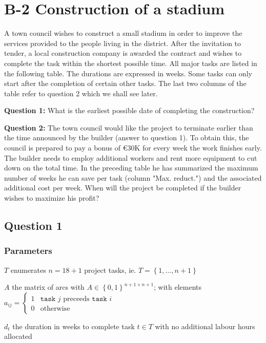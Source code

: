\chapter{B-2 Construction of a stadium}

A town council wishes to construct a small stadium in order to improve the
services provided to the people living in the district. After the invitation to
tender, a local construction company is awarded the contract and wishes
to complete the task within the shortest possible time. All major tasks are
listed in the following table. The durations are expressed in weeks. Some tasks
can only start after the completion of certain other tasks. The last two
columns of the table refer to question 2 which we shall see later.

\textbf{Question 1:} What is the earliest possible date of completing the
construction?

\textbf{Question 2:} The town council would like the project to terminate earlier
than the time announced by the builder (answer to question 1). To obtain this,
the council is prepared to pay a bonus of $\euro{}30\mathrm{K}$ for every week the work
finishes early. The builder needs to employ additional workers and rent more
equipment to cut down on the total time. In the preceding table he has 
summarized the maximum number of weeks he can save per task (column "Max. reduct.")
and the associated additional cost per week. When will the project be completed
if the builder wishes to maximize his profit?

\newpage

\section{Question 1}

\subsection{Parameters}

\begin{syms}
\item[$T$] enumerates $n=18+1$ project tasks, ie. $T=\left\lbrace 1,\ldots, n+1\right\rbrace$

\item[$A$] the matrix of arcs with $A\in\left\lbrace 0,1\right\rbrace^{n+1\times n+1}$;
    with elements $a_{ij}=\begin{cases}1 & \texttt{task } j \text{ preceeds }\texttt{task }i\\
    0 & \text{otherwise}\end{cases}$

\item[$d_t$] the duration in weeks to complete task $t\in T$ with no additional labour hours allocated

\end{syms}

